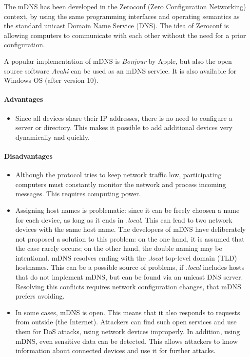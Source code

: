 \documentclass[fleqn, 11pt]{SelfArx} %
\begin{document}
The mDNS has been developed in the Zeroconf (Zero Configuration Networking) context, by using the same programming interfaces and operating semantics as the standard unicast Domain Name Service (DNS). 
The idea of Zeroconf is allowing computers to communicate with each other without the need for a prior configuration.\newline

A popular implementation of mDNS is \textit{Bonjour} by Apple, but also the open source software \textit{Avahi} can be used as an mDNS service. It is also available for Windows OS (after version 10).

\paragraph{Advantages} 
\begin{itemize}[leftmargin=*]
    \item Since all devices share their IP addresses, there is no need to configure a server or directory. This makes it possible to add additional devices very dynamically and quickly.
\end{itemize}

\paragraph{Disadvantages} 
\begin{itemize}[leftmargin=*]
    \item Although the protocol tries to keep network traffic low, participating computers must constantly monitor the network and process incoming messages. This requires computing power.
    \item Assigning host names is problematic: since it can be freely choosen a name for each device, as long as it ends in {\it{.local}}. This can lead to two network devices with the same host name. The developers of mDNS have deliberately not proposed a solution to this problem: on the one hand, it is assumed that the case rarely occurs; on the other hand, the double naming may be intentional. \newline 
    mDNS resolves ending with the {\it{.local}} top-level domain (TLD) hostnames. This can be a possible source of problems, if {\it{.local}} includes hosts that do not implement mDNS, but can be found via an unicast DNS server. Resolving this conflicts requires network configuration changes, that mDNS prefers avoiding.
    \item In some cases, mDNS is open. This means that it also responds to requests from outside (the Internet). Attackers can find such open services and use them for DoS attacks, using network devices improperly. \newline
    In addition, using mDNS, even sensitive data can be detected. This allows attackers to know information about connected devices and use it for further attacks.
\end{itemize}
\end{document}
